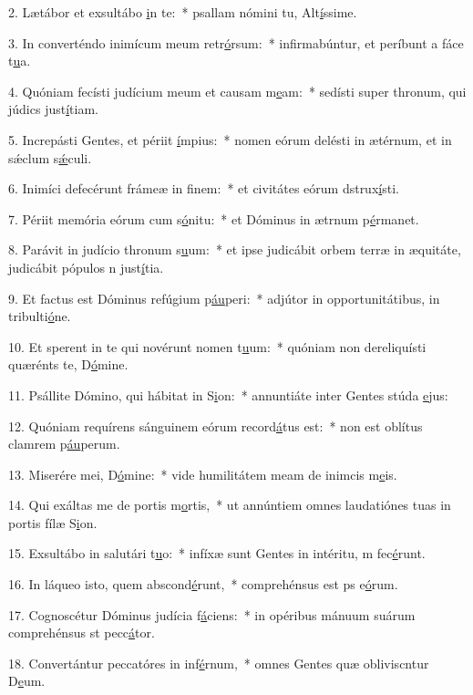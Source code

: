 2. Lætábor et exsultábo \uline{i}n te:~* psallam nómini tu, Alt\uline{í}ssime.\par 
3. In converténdo inimícum meum retr\uline{ó}rsum:~* infirmabúntur, et períbunt a fáce t\uline{u}a.\par 
4. Quóniam fecísti judícium meum et causam m\uline{e}am:~* sedísti super thronum, qui júdics just\uline{í}tiam.\par 
5. Increpásti Gentes, et périit \uline{í}mpius:~* nomen eórum delésti in ætérnum, et in sǽclum s\uline{ǽ}culi.\par 
6. Inimíci defecérunt frámeæ in f\uline{i}nem:~* et civitátes eórum dstrux\uline{í}sti.\par 
7. Périit memória eórum cum s\uline{ó}nitu:~* et Dóminus in ætrnum p\uline{é}rmanet.\par 
8. Parávit in judício thronum s\uline{u}um:~* et ipse judicábit orbem terræ in æquitáte, judicábit pópulos n just\uline{í}tia.\par 
9. Et factus est Dóminus refúgium p\uline{áu}peri:~* adjútor in opportunitátibus, in tribulti\uline{ó}ne.\par 
10. Et sperent in te qui novérunt nomen t\uline{u}um:~* quóniam non dereliquísti quærénts te, D\uline{ó}mine.\par 
11. Psállite Dómino, qui hábitat in S\uline{i}on:~* annuntiáte inter Gentes stúda \uline{e}jus:\par 
12. Quóniam requírens sánguinem eórum record\uline{á}tus est:~* non est oblítus clamrem p\uline{áu}perum.\par 
13. Miserére mei, D\uline{ó}mine:~* vide humilitátem meam de inimcis m\uline{e}is.\par 
14. Qui exáltas me de portis m\uline{o}rtis,~* ut annúntiem omnes laudatiónes tuas in portis fílæ S\uline{i}on.\par 
15. Exsultábo in salutári t\uline{u}o:~* infíxæ sunt Gentes in intéritu, m fec\uline{é}runt.\par 
16. In láqueo isto, quem abscond\uline{é}runt,~* comprehénsus est ps e\uline{ó}rum.\par 
17. Cognoscétur Dóminus judícia f\uline{á}ciens:~* in opéribus mánuum suárum comprehénsus st pecc\uline{á}tor.\par 
18. Convertántur peccatóres in inf\uline{é}rnum,~* omnes Gentes quæ obliviscntur D\uline{e}um.\par 

